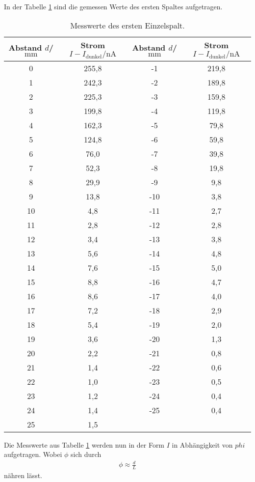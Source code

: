In der Tabelle \ref{tab:spalt1} sind die gemessen Werte
des ersten Spaltes aufgetragen.
\begin{table}
  \centering
  \caption{Messwerte des ersten Einzelspalt.}
  \label{tab:spalt1}
  \begin{tabular}{c c c c}
Abstand $d$/$\si{\milli\meter}$ & Strom $I-I_\mathrm{dunkel}/\si{\nano\ampere}$ & Abstand $d$/$\si{\milli\meter}$ & Strom $I-I_\mathrm{dunkel}/\si{\nano\ampere}$\\
    \midrule
     0 & 255,8 & -1   & 219,8\\
     1 & 242,3 & -2   & 189,8\\
     2 & 225,3 & -3   & 159,8\\
     3 & 199,8 & -4   & 119,8\\
     4 & 162,3 & -5   & 79,8 \\
     5 & 124,8 & -6   & 59,8 \\
     6 & 76,0  & -7   & 39,8 \\
     7 & 52,3  & -8   & 19,8 \\
     8 & 29,9  & -9   & 9,8  \\
     9 & 13,8  & -10  & 3,8  \\
    10 & 4,8   & -11  & 2,7  \\
    11 & 2,8   & -12  & 2,8  \\
    12 & 3,4   & -13  & 3,8  \\
    13 & 5,6   & -14  & 4,8  \\
    14 & 7,6   & -15  & 5,0  \\
    15 & 8,8   & -16  & 4,7  \\
    16 & 8,6   & -17  & 4,0  \\
    17 & 7,2   & -18  & 2,9  \\
    18 & 5,4   & -19  & 2,0  \\
    19 & 3,6   & -20  & 1,3  \\
    20 & 2,2   & -21  & 0,8  \\
    21 & 1,4   & -22  & 0,6  \\
    22 & 1,0   & -23  & 0,5  \\
    23 & 1,2   & -24  & 0,4  \\
    24 & 1,4   & -25  & 0,4  \\
    25 & 1,5   & &           \\
    \bottomrule
    \end{tabular}
\end{table}

Die Messwerte aus Tabelle \ref{tab:spalt1} werden nun
in der Form $I$ in Abhängigkeit von $phi$
aufgetragen.
Wobei $\phi$ sich durch
\begin{align*}
  \phi\approx\frac{d}{L}
\end{align*}
nähren lässt.

